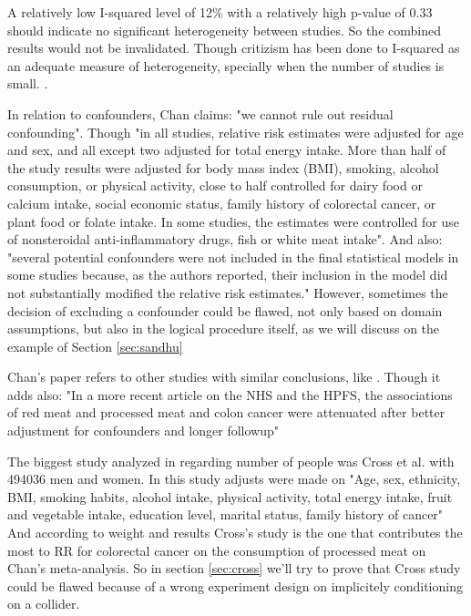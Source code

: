 \documentclass{article}
\begin{document}
A relatively low I-squared level of 12\% with a relatively high p-value of 0.33 should indicate no significant heterogeneity between studies. So the combined results would not be invalidated. Though critizism has been done to I-squared as an adequate measure of heterogeneity, specially when the number of studies is small. \cite{hippel}.

In relation to confounders, Chan claims: "we cannot rule out residual confounding". Though "in all studies, relative risk estimates were adjusted for age and sex, and all except two adjusted for total energy intake. More than
half of the study results were adjusted for body mass index (BMI), smoking, alcohol consumption, or physical activity, close to half controlled for dairy food or calcium intake, social economic status,
family history of colorectal cancer, or plant food or folate intake.
In some studies, the estimates were controlled for use of nonsteroidal
anti-inflammatory drugs, fish or white meat intake". And also: "several
potential confounders were not included in the final statistical
models in some studies because, as the authors reported, their
inclusion in the model did not substantially modified the relative
risk estimates." However, sometimes the decision of excluding a confounder could be flawed, not only based on domain assumptions, but also in the logical procedure itself, as we will discuss on the example of Section \ref{sec:sandhu}

Chan's paper refers to other studies with similar conclusions, like \cite{aicr,wei2009}.
Though it adds also: "In a more recent article on the NHS and the HPFS, the
associations of red meat and processed meat and colon cancer were
attenuated after better adjustment for confounders and longer followup" \cite{wei}

The biggest study analyzed in \cite{chan} regarding number of people was Cross et al. \cite{cross} with 494036 men and women. In this study adjusts were made on "Age, sex, ethnicity, BMI, smoking habits, alcohol intake, physical activity, total energy intake, fruit and vegetable intake, education level, marital status, family history of cancer"
And according to weight and results Cross's study is the one that contributes the most to RR for colorectal cancer on the consumption of processed meat on Chan's meta-analysis. So in section \ref{sec:cross} we'll try to prove that Cross study could be flawed because of a wrong experiment design on implicitely conditioning on a collider.
\end{document}
